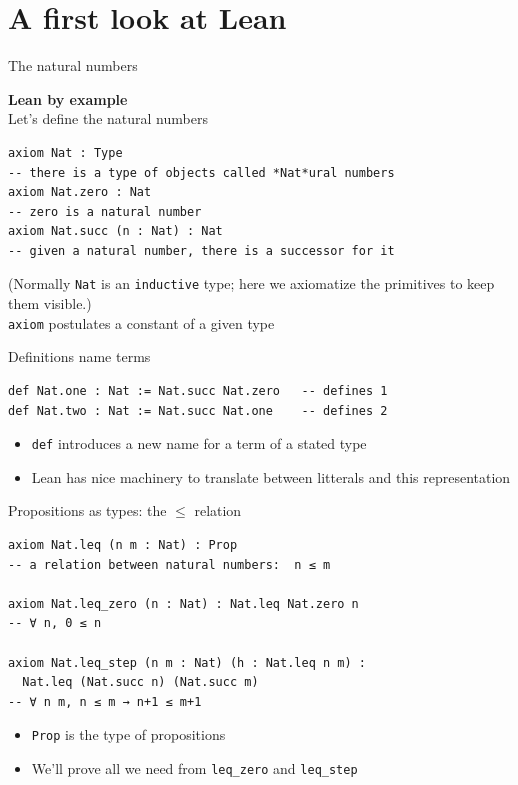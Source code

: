 \documentclass[aspectratio=169]{beamer}
\begin{document}
\section{A first look at Lean}


\begin{frame}[fragile]{The natural numbers}
	
\large{\textbf{Lean by example}}
\\Let's define the natural numbers
	
\begin{lstlisting}
axiom Nat : Type
-- there is a type of objects called *Nat*ural numbers
axiom Nat.zero : Nat
-- zero is a natural number
axiom Nat.succ (n : Nat) : Nat
-- given a natural number, there is a successor for it
\end{lstlisting}
\small{(Normally \texttt{Nat} is an \texttt{inductive} type; here we
	axiomatize the primitives to keep them visible.)}
\\\texttt{axiom} postulates a constant of a given type
\end{frame}

\begin{frame}[fragile]{Definitions name terms}
\begin{lstlisting}
def Nat.one : Nat := Nat.succ Nat.zero   -- defines 1
def Nat.two : Nat := Nat.succ Nat.one    -- defines 2
\end{lstlisting}
  \begin{itemize}
    \item \texttt{def} introduces a new name for a term of a stated type
    \item Lean has nice machinery to translate between litterals and this representation
  \end{itemize}
\end{frame}

\begin{frame}[fragile]{Propositions as types: the $\leq$ relation}
\begin{lstlisting}
axiom Nat.leq (n m : Nat) : Prop
-- a relation between natural numbers:  n ≤ m

axiom Nat.leq_zero (n : Nat) : Nat.leq Nat.zero n
-- ∀ n, 0 ≤ n

axiom Nat.leq_step (n m : Nat) (h : Nat.leq n m) :
  Nat.leq (Nat.succ n) (Nat.succ m)
-- ∀ n m, n ≤ m → n+1 ≤ m+1
\end{lstlisting}
  \begin{itemize}
    \item \texttt{Prop} is the type of \alert{propositions}
    \item We'll prove all we need from \texttt{leq\_zero} and \texttt{leq\_step}
  \end{itemize}
\end{frame}
\end{document}
